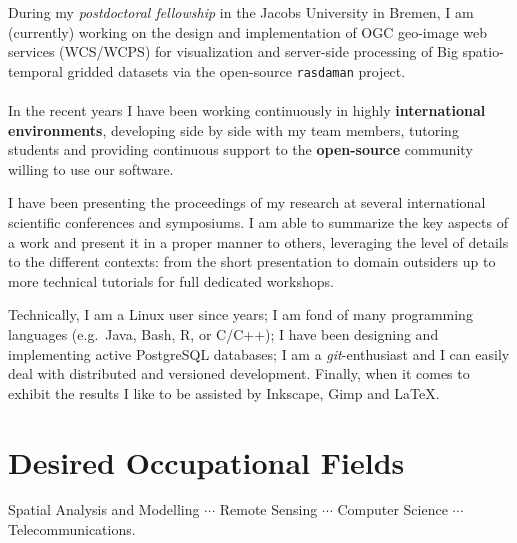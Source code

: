 \documentclass[10pt]{article}
\begin{document}
During my \emph{postdoctoral fellowship} in the Jacobs University in Bremen, I am (currently) working on the design
and implementation of OGC geo-image web services (WCS\slash WCPS) for visualization and server-side processing
of Big spatio-temporal gridded datasets via the \mbox{open-source} \texttt{rasdaman} project.
~\\ ~\\
In the recent years I have been working continuously in highly \textbf{international environments},
developing side by side with my team members, tutoring students and providing continuous support to
the \mbox{\textbf{open-source}} community willing to use our software.

I have been presenting the proceedings of my research at several international
scientific conferences and symposiums.
I am able to summarize the key aspects of a work and present it in a proper manner to others,
leveraging the level of details to the different contexts: from the short presentation to domain outsiders
up to more technical tutorials for full dedicated workshops.

Technically, I am a Linux user since years; I am fond of many programming languages
(e.g.~Java, Bash, R, or C\slash C++); I have been designing and implementing active
PostgreSQL databases; I am a \textsl{git}-enthusiast and I can easily deal with distributed and versioned development.
Finally, when it comes to exhibit the results I like to be assisted by Inkscape, Gimp and \LaTeX{}.


\section*{Desired Occupational Fields}
{\normalsize Spatial Analysis and Modelling $\cdots$ Remote Sensing $\cdots$ Computer Science $\cdots$ Telecommunications.}

\pagebreak
\end{document}
